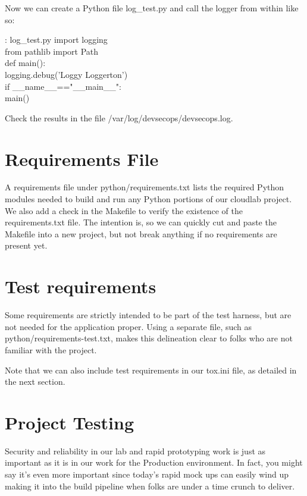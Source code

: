 Now we can create a Python file log\_test.py and call the logger from
within like so:

\begin{mybox}{\thetcbcounter: log\_test.py}
import logging\\
from pathlib import Path\\

def main():\\
   logging.debug('Loggy Loggerton')\\
   if \_\_name\_\_=="\_\_main\_\_":\\
   main()
\end{mybox}

Check the results in the file /var/log/devsecops/devsecops.log.

\section{Requirements File}

\justify
A requirements file under python/requirements.txt lists the required
Python modules needed to build and run any Python portions of our
cloudlab project. We also add a check in the Makefile to verify the
existence of the requirements.txt file. The intention is, so we can
quickly cut and paste the Makefile into a new project, but not break
anything if no requirements are present yet.

\section{Test requirements}

\justify
Some requirements are strictly intended to be part of the test harness,
but are not needed for the application proper. Using a separate file,
such as python/requirements-test.txt, makes this delineation clear to
folks who are not familiar with the project.

\justify
Note that we can also include test requirements in our tox.ini file, as detailed in the next section.

\section{Project Testing}

Security and reliability in our lab and rapid prototyping work is just as important as it is in our work for the Production environment. In fact, you might say it's even more important since today's rapid mock ups
can easily wind up making it into the build pipeline when folks are under a time crunch to deliver.

